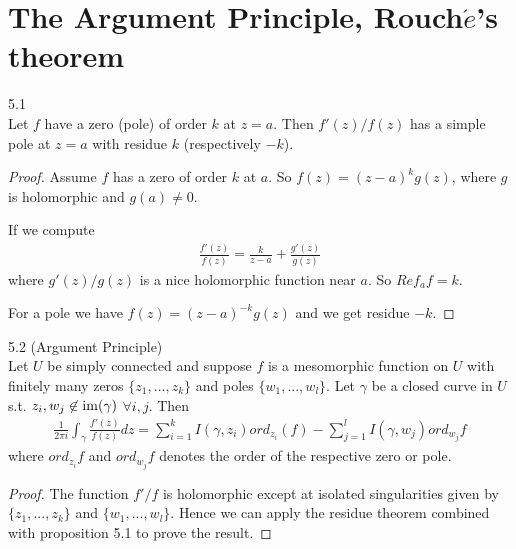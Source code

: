 \documentclass[a4paper]{article}
\begin{document}
\newpage

\section{The Argument Principle, Rouch$\acute{e}$'s theorem}

\begin{prop} 5.1\\
Let $f$ have a zero (pole) of order $k$ at $z=a$. Then $f'(z)/f(z)$ has a simple pole at $z=a$ with residue $k$ (respectively $-k$).
\begin{proof}
Assume $f$ has a zero of order $k$ at $a$. So $f(z) = (z-a)^k g(z)$, where $g$ is holomorphic and $g(a) \neq 0$.

If we compute
\begin{equation*}
\begin{aligned}
\frac{f'(z)}{f(z)} = \frac{k}{z-a} + \frac{g'(z)}{g(z)}
\end{aligned}
\end{equation*}
where $g'(z)/g(z)$ is a nice holomorphic function near $a$. So $Ref_a f = k$.

For a pole we have $f(z) = (z-a)^{-k} g(z)$ and we get residue $-k$.
\end{proof}
\end{prop}

\begin{thm} 5.2 (Argument Principle)\\
Let $U$ be simply connected and suppose $f$ is a mesomorphic function on $U$ with finitely many zeros $\{z_1,...,z_k\}$ and poles $\{w_1,...,w_l\}$. Let $\gamma$ be a closed curve in $U$ s.t. $z_i,w_j \not\in \operatorname{im}(\gamma)$ $\forall i,j$. Then
\begin{equation*}
\begin{aligned}
\frac{1}{2\pi i} \int_\gamma \frac{f'(z)}{f(z)} dz = \sum_{i=1}^k I(\gamma,z_i) ord_{z_i}(f) - \sum_{j=1}^l I(\gamma,w_j) ord_{w_j} f
\end{aligned}
\end{equation*}
where $ord_{z_i} f$ and $ord_{w_j} f$ denotes the order of the respective zero or pole.
\begin{proof}
The function $f'/f$ is holomorphic except at isolated singularities given by $\{z_1,...,z_k\}$ and $\{w_1,...,w_l\}$. Hence we can apply the residue theorem combined with proposition 5.1 to prove the result.
\end{proof}
\end{thm}
\end{document}
